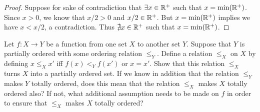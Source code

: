 \begin{proof}
  Suppose for sake of contradiction that \(\exists x \in \mathbb{R}^+\) such that \(x = \min(\mathbb{R}^+)\).
  Since \(x > 0\), we know that \(x / 2 > 0\) and \(x / 2 \in \mathbb{R}^+\).
  But \(x = \min(\mathbb{R}^+)\) implies we have \(x < x / 2\), a contradiction.
  Thus \(\nexists x \in \mathbb{R}^+\) such that \(x = \min(\mathbb{R}^+)\).
\end{proof}

\begin{ex}\label{i:ex:8.5.5}
  Let \(f : X \to Y\) be a function from one set \(X\) to another set \(Y\).
  Suppose that \(Y\) is partially ordered with some ordering relation \(\leq_Y\).
  Define a relation \(\leq_X\) on \(X\) by defining \(x \leq_X x'\) iff \(f(x) <_Y f(x')\) or \(x = x'\).
  Show that this relation \(\leq_X\) turns \(X\) into a partially ordered set.
  If we know in addition that the relation \(\leq_Y\) makes \(Y\) totally ordered, does this mean that the relation \(\leq_X\) makes \(X\) totally ordered also?
  If not, what additional assumption needs to be made on \(f\) in order to ensure that \(\leq_X\) makes \(X\) totally ordered?
\end{ex}

